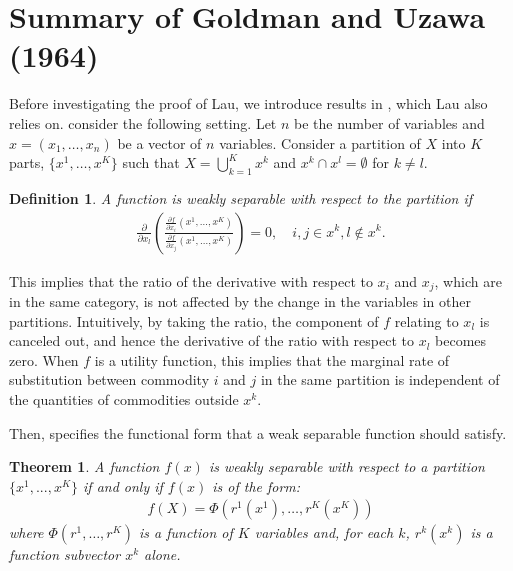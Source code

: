 \documentclass[11pt, a4paper]{article}
\newtheorem{theorem}{Theorem}
\newtheorem{definition}{Definition}
\theoremstyle{remark}
\begin{document}
\section{Summary of Goldman and Uzawa (1964)}
Before investigating the proof of Lau, we introduce results in \citet{goldmanNote1964}, which Lau also relies on.
\citet{goldmanNote1964} consider the following setting.
Let $n$ be the number of variables and $x = (x_{1},\ldots, x_{n})$ be a vector of $n$ variables.
Consider a partition of $X$ into $K$ parts, $\{x^1, \ldots, x^K\}$ such that $X = \bigcup_{k=1}^K x^k$ and $x^k \cap x^l = \emptyset$ for $k\ne l$.
\begin{framed}
    \begin{definition}\label{def:weal_separable}
        A function is weakly separable with respect to the partition if 
        \begin{align}
            \frac{\partial}{\partial x_l}\left(\frac{\frac{\partial f}{\partial x_i}(x^1, \ldots, x^K)}{\frac{\partial f}{\partial x_j}(x^1, \ldots, x^K)}\right) = 0, \quad i,j\in x^k, l \notin x^k.
        \end{align}
    \end{definition}
\end{framed}
This implies that the ratio of the derivative with respect to $x_i$ and $x_j$, which are in the same category, is not affected by the change in the variables in other partitions.
Intuitively, by taking the ratio, the component of $f$ relating to $x_l$ is canceled out, and hence the derivative of the ratio with respect to $x_l$ becomes zero.
When $f$ is a utility function, this implies that the marginal rate of substitution between commodity $i$ and $j$ in the same partition is independent of the quantities of commodities outside $x^k$.

Then, \citet{goldmanNote1964} specifies the functional form that a weak separable function should satisfy.
\begin{framed}
    \begin{theorem}\label{thorem_2_GU}
    A function $f(x)$ is weakly separable with respect to a partition $\{x^1, .. ., x^K\}$ if and only if $f(x)$ is of the form: 
    \begin{align}
        f(X) = \Phi(r^1(x^{1}),\ldots, r^K(x^{K})   )
    \end{align} where $\Phi(r^1,\ldots, r^K)$ is a function of $K$ variables and, for each $k$, $r^k(x^{k})$ is a function subvector $x^{k}$ alone.
    \end{theorem}
\end{framed}
\end{document}
